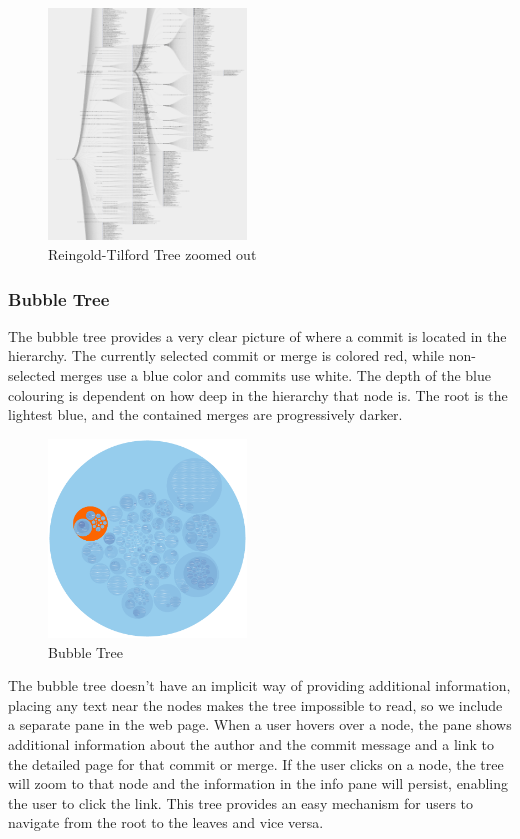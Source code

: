 \documentclass[conference, draftclsnofoot]{IEEEtran}
\begin{document}
\begin{figure}
        \centering
        \includegraphics[width=0.47\textwidth]{figures/tree_zoom.png}
        \caption{Reingold-Tilford Tree zoomed out}
        \label{fig:zoomed_tree}
\end{figure}

\subsubsection{Bubble Tree}

The bubble tree provides a very clear picture of where a commit is located in the
hierarchy. The currently selected commit or merge is colored red, while non-selected
merges use a blue color and commits use white. The depth of the blue colouring is
dependent on how deep in the hierarchy that node is. The root is the lightest blue,
and the contained merges are progressively darker.

\begin{figure}
        \centering
        \includegraphics[width=0.47\textwidth]{figures/bubble_tree.pdf}
        \caption{Bubble Tree}
        \label{fig:bubble_tree}
\end{figure}

The bubble tree doesn't have an implicit way of providing additional information,
placing any text near the nodes makes the tree impossible to read, so we include a
separate pane in the web page. When a user hovers over a node, the pane shows
additional information about the author and the commit message and a link to the
detailed page for that commit or merge. If the user clicks on a node, the tree will
zoom to that node and the information in the info pane will persist, enabling the
user to click the link. This tree provides an easy mechanism for users to navigate
from the root to the leaves and vice versa.
\end{document}

